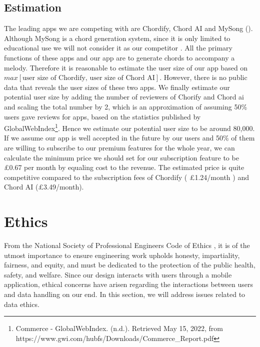 \subsection{Estimation}
The leading apps we are competing with are Chordify, Chord AI and MySong (\cite{MySong}). Although MySong is a chord generation system, since it is only limited to educational use we will not consider it as our competitor . All the primary functions of these apps and our app are to generate chords to accompany a melody.  Therefore it is reasonable to estimate the user size of our app based on $max[\text{user size of Chordify, user size of Chord AI}]$. However, there is no public data that reveals the user sizes of these two apps. We finally estimate our potential user size by adding the number of reviewers of Chorify and Chord ai and scaling the total number by 2, which is an approximation of assuming 50\% users gave reviews for apps, based on the statistics published by GlobalWebIndex\footnote{Commerce - GlobalWebIndex. (n.d.). Retrieved May 15, 2022, from https://www.gwi.com/hubfs/Downloads/Commerce\_Report.pdf}. Hence we estimate our potential user size to be around 80,000. If we assume our app is well accepted in the future by our users and 50\% of them are willing to subscribe to our premium features for the whole year, we can calculate the minimum price we should set for our subscription feature to be £0.67 per month by equaling cost to the revenue. The estimated price is quite competitive compared to the subscription fees of Chordify ( £1.24/month ) and Chord AI (£3.49/month).
\section{Ethics}
\label{sec:dataethics}
From the National Society of Professional Engineers Code of Ethics , it is of the utmost 
importance to ensure engineering work upholds honesty, impartiality, fairness, and equity, and must be dedicated to 
the protection of the public health, safety, and welfare. Since our design interacts with users
through a mobile application, ethical concerns have arisen regarding the interactions between users 
and data handling on our end. In this section, we will address issues related to data ethics.


